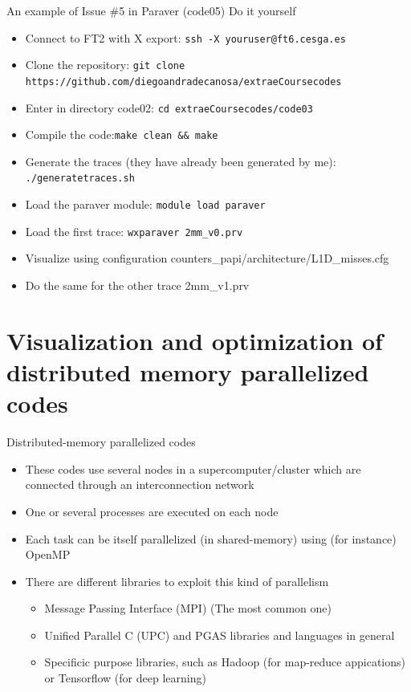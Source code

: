 \documentclass[10pt,xcolor=table]{beamer}
\begin{document}
\begin{frame}{An example of Issue \#5 in Paraver (code05)}
Do it yourself
\begin{itemize}
    \item Connect to FT2 with X export: {\tt ssh -X youruser@ft6.cesga.es}
    \item Clone the repository: {\tt git clone https://github.com/diegoandradecanosa/extraeCoursecodes}
    \item Enter in directory code02: {\tt cd extraeCoursecodes/code03}
        \item Compile the code:{\tt make clean && make}
    \item Generate the traces (they have already been generated by me): {\tt ./generatetraces.sh}
    \item Load the paraver module:  {\tt module load paraver}
    \item Load the first trace: {\tt wxparaver 2mm\_v0.prv}
    \item Visualize using configuration counters\_papi/architecture/L1D\_misses.cfg
    \item Do the same for the other trace 2mm\_v1.prv
\end{itemize}
\end{frame}




\section{Visualization and optimization of distributed memory parallelized codes}


\begin{frame}{Distributed-memory parallelized codes}
\begin{itemize}
    \item These codes use several nodes in a supercomputer/cluster which are connected through an interconnection network
    \item One or several processes are executed on each node
    \item Each task can be itself parallelized (in shared-memory) using (for instance) OpenMP
    \item There are different libraries to exploit this kind of parallelism
        \begin{itemize}
            \item Message Passing Interface (MPI) (The most common one) 
            \item Unified Parallel C (UPC) and PGAS libraries and languages in general
            \item Specificic purpose libraries, such as Hadoop (for map-reduce appications) or Tensorflow (for deep learning) 
        \end{itemize}
\end{itemize}
\end{frame}
\end{document}
